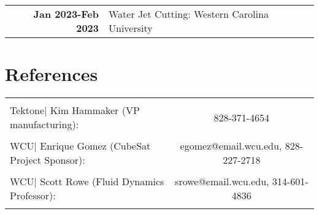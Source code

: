 \documentclass[allblack]{simplehipstercv}
\begin{document}
\begin{paracol}{2}
\begin{tabular}{>{\footnotesize\bfseries}r p{}}
    Jan 2023-Feb 2023 & Water Jet Cutting: Western Carolina University \\
\end{tabular}

\section*{References}
\begin{tabular}{l c}
    \hline & \\[0.25mm]
    Tektone| Kim Hammaker (VP manufacturing): & 828-371-4654\\[2pt]
    \hline & \\[0.25mm]
    WCU| Enrique Gomez (CubeSat Project Sponsor): & egomez@email.wcu.edu, 828-227-2718\\[2pt]
    \hline & \\[0.25mm]
    WCU| Scott Rowe (Fluid Dynamics Professor): & srowe@email.wcu.edu, 314-601-4836\\[2pt]
    \hline & \\[0.25mm]
\end{tabular}

\bigskip
\newpage

\end{paracol}
\end{document}
